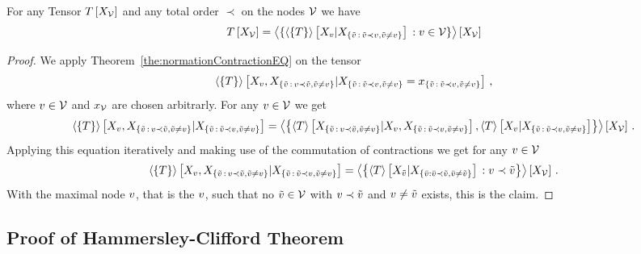 \begin{theorem}\label{the:genericChainRule}
	For any Tensor $T\left[X_{\mathcal{V}}\right]$ and any total order $\prec$ on the nodes $\mathcal{V}$ we have %
	\begin{align*}
		T\left[X_{\mathcal{V}}\right] = 
		\left\langle 
			\{ \left\langle \left\{T\right\}\right\rangle \left[ X_{v} | X_{\{\tilde{v} \, : \, \tilde{v} \prec v, \tilde{v}\neq v\}} \right]  \, : v\in\mathcal{V} \}
		\right\rangle \left[ X_{\mathcal{V}} \right]
	\end{align*}
\end{theorem}
\begin{proof}
	We apply Theorem~\ref{the:normationContractionEQ} on the tensor
	\begin{align*}
		\left\langle \left\{T\right\}\right\rangle \left[ 
			X_{v},X_{\{\tilde{v} \, : \, v \prec \tilde{v}, \tilde{v}\neq v\}}
		 | 
			X_{\{\tilde{v} \, : \, \tilde{v} \prec v, \tilde{v}\neq v\}}=x_{\{\tilde{v} \, : \, \tilde{v} \prec v, \tilde{v}\neq v\}}
		 \right] \, ,
	\end{align*}
	where $v\in\mathcal{V}$ and $x_{\mathcal{V}}$ are chosen arbitrarly.
	For any $v\in\mathcal{V}$ we get
	\begin{align*}
		\left\langle \left\{T\right\}\right\rangle \left[ 
			X_{v},X_{\{\tilde{v} \, : \, v \prec \tilde{v}, \tilde{v}\neq v\}}
			 | 
			X_{\{\tilde{v} \, : \, \tilde{v} \prec v, \tilde{v}\neq v\}}
		 \right] 
		= \left\langle \left\{
			\left\langle T\right\rangle \left[ 
				X_{\{\tilde{v} \, : \, v \prec \tilde{v}, \tilde{v}\neq v\}}
				 | 
				X_{v},X_{\{\tilde{v} \, : \, \tilde{v} \prec v, \tilde{v}\neq v\}}
				 \right],
			\left\langle T\right\rangle \left[ 
				X_{v}
				 | 
				X_{\{\tilde{v} \, : \, \tilde{v} \prec v, \tilde{v}\neq v\}}
				 \right]
		\right\}\right\rangle \left[ 
			X_{\mathcal{V}} 
		 \right] \, .
	\end{align*}
	Applying this equation iteratively and making use of the commutation of contractions we get for any $v\in\mathcal{V}$
	\begin{align*}
		\left\langle \left\{T\right\}\right\rangle \left[ 
			X_{v},X_{\{\tilde{v} \, : \, v \prec \tilde{v}, \tilde{v}\neq v\}}
		 | 
			X_{\{\tilde{v} \, : \, \tilde{v} \prec v, \tilde{v}\neq v\}}
		 \right]
		= \left\langle \left\{
			\left\langle T\right\rangle \left[ 
				X_{\tilde{v}}
			 | 
				X_{\{\bar{v} : \bar{v} \prec \tilde{v}, \bar{v}\neq\tilde{v}\}}
			 \right] 
			\, : v \prec \tilde{v}
		\right\}\right\rangle \left[ 
			X_{\mathcal{V}} 
		 \right] \, .
	\end{align*}
	With the maximal node $v$, that is the $v$, such that no $\tilde{v}\in\mathcal{V}$ with $v\prec\tilde{v}$ and $v\neq\tilde{v}$ exists, this is the claim.
\end{proof}




\subsection{Proof of Hammersley-Clifford Theorem}\label{sec:proofHCTheorem}

